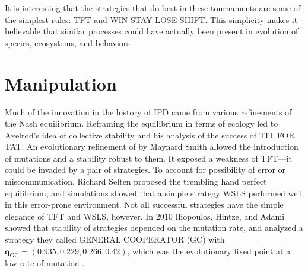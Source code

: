 It is interesting that the strategies that do best in these tournaments are some of the simplest rules: TFT and WIN-STAY-LOSE-SHIFT. This simplicity makes it believable that similar processes could have actually been present in evolution of species, ecosystems, and behaviors.






\chapter{Manipulation}

Much of the innovation in the history of IPD came from various refinements of the Nash equilibrium. Reframing the equilibrium in terms of ecology led to Axelrod's idea of collective stability and his analysis of the success of TIT FOR TAT. An evolutionary refinement of by Maynard Smith allowed the introduction of mutations and a stability robust to them. It exposed a weakness of TFT---it could be invaded by a pair of strategies. To account for possibility of error or miscommunication, Richard Selten \cite{Selten_1975} proposed the trembling hand perfect equilibrium, and simulations showed that a simple strategy WSLS performed well in this error-prone environment. Not all successful strategies have the simple elegance of TFT and WSLS, however. In 2010 Iliopoulos, Hintze, and Adami showed that stability of strategies depended on the mutation rate, and analyzed a strategy they called GENERAL COOPERATOR (GC) with $\mathbf{q}_{\textrm{GC}} = (0.935, 0.229, 0.266, 0.42)$, which was the evolutionary fixed point at a low rate of mutation \cite{iliopoulos_2010}.

